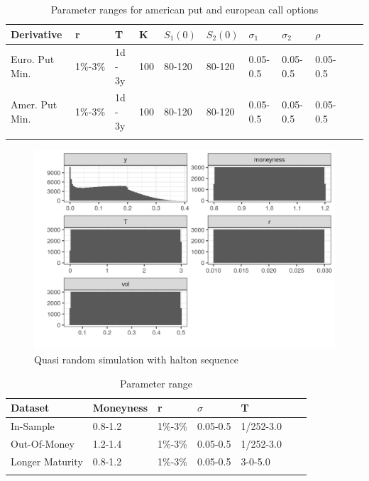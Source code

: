 \begin{table}[H]
\caption[Parameter Ranges For MLPs]{Parameter ranges for american put and european call options}
\label{tab:euroParRange}
\centering
\begin{tabular}{l l l l l l l l l l l}
\toprule
\textbf{Derivative} & \textbf{r} & \textbf{T} & K & $S_1(0)$ & $S_2(0)$ & $\sigma_1$ & $\sigma_2$ & $\rho$ \\
\midrule
Euro. Put Min. & 1\%-3\% & 1d - 3y & 100 & 80-120 & 80-120 & 0.05-0.5 & 0.05-0.5 & 0.05-0.5\\ 
Amer. Put Min. & 1\%-3\% & 1d - 3y & 100 & 80-120 & 80-120 & 0.05-0.5 & 0.05-0.5 & 0.05-0.5\\
\bottomrule\\
\end{tabular}
\end{table}
 
\begin{figure}[H]
\centering
\includegraphics{Figures/marginalAmerPut.png}
\decoRule
\caption[Marginal distributions for american put]{Quasi random simulation with halton sequence}
\label{fig:marginalAmerPut}
\end{figure}

\begin{table}[H]
\caption{Parameter range}
\label{tab:totalEuroParRange}
\centering
\begin{tabular}{l l l l l l l }
\toprule
\textbf{Dataset} & \textbf{Moneyness} & \textbf{r} & \textbf{$\sigma$} & \textbf{T} \\
\midrule
In-Sample & 0.8-1.2 & 1\%-3\% & 0.05-0.5 & 1/252-3.0\\ 
Out-Of-Money & 1.2-1.4 & 1\%-3\% & 0.05-0.5 & 1/252-3.0\\ 
Longer Maturity & 0.8-1.2 & 1\%-3\% & 0.05-0.5 & 3-0-5.0\\ 
\bottomrule\\
\end{tabular}
\end{table}

